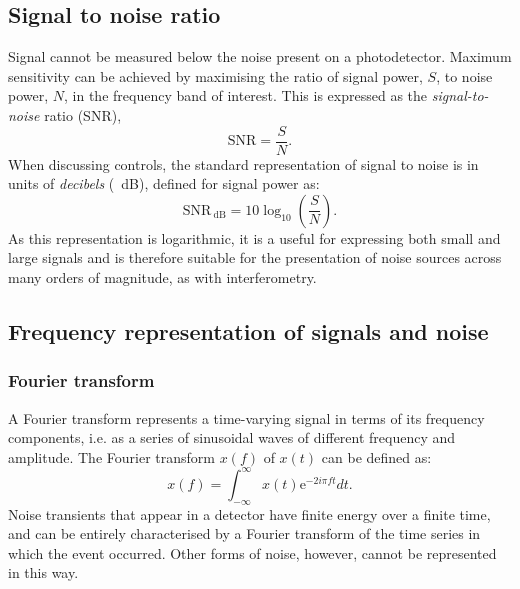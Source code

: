 \subsection{\label{sec:snr}Signal to noise ratio}
Signal cannot be measured below the noise present on a photodetector. Maximum sensitivity can be achieved by maximising the ratio of signal power, $S$, to noise power, $N$, in the frequency band of interest. This is expressed as the \emph{signal-to-noise} ratio (SNR),
\begin{equation}
  \text{SNR} = \frac{S}{N}.
\end{equation}
When discussing controls, the standard representation of signal to noise is in units of \emph{decibels} (\SI{}{\deci\bel}), defined for signal power as:
\begin{equation}
  \text{SNR}_{\SI{}{\deci\bel}} = 10 \log_{10} \left( \frac{S}{N} \right).
\end{equation}
As this representation is logarithmic, it is a useful for expressing both small and large signals and is therefore suitable for the presentation of noise sources across many orders of magnitude, as with interferometry.


\subsection{\label{sec:freq-resp-signals}Frequency representation of signals and noise}
\subsubsection{\label{sec:fourier-transform}Fourier transform}
A Fourier transform represents a time-varying signal in terms of its frequency components, i.e. as a series of sinusoidal waves of different frequency and amplitude. The Fourier transform $x \left( f \right)$ of $x \left( t \right)$ can be defined as:
\begin{equation}
  \label{eq:fourier-transform}
  x \left( f \right) = \int^{\infty}_{-\infty} x \left( t \right) \text{e}^{-2i \pi f t} dt.
\end{equation}
Noise transients that appear in a detector have finite energy over a finite time, and can be entirely characterised by a Fourier transform of the time series in which the event occurred. Other forms of noise, however, cannot be represented in this way.

